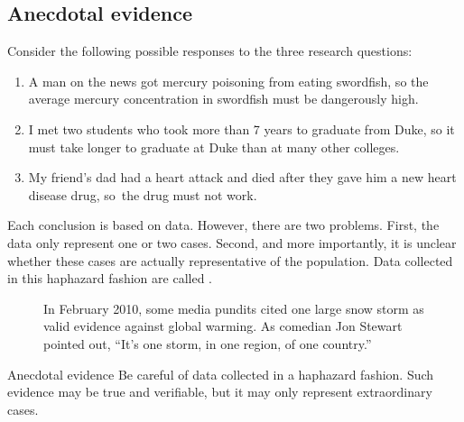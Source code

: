 \subsection{Anecdotal evidence}
\label{anecdotalEvidenceSubsection}


\noindent%
Consider the following possible responses to the three research questions:
\begin{enumerate}
\setlength{\itemsep}{0mm}
\item
    A man on the news got mercury poisoning from eating swordfish,
    so the average mercury concentration in swordfish must be
    dangerously high.
\item\label{iKnowThreeStudentsWhoTookMoreThan7YearsToGraduateAtDuke}
    I met two students who took more than 7 years to graduate
    from Duke, so it must take longer to graduate at Duke than
    at many other colleges.
\item\label{myFriendsDadDiedAfterSulphinpyrazon}
    My friend's dad had a heart attack and died after they gave
    him a new heart disease drug, so~the drug must not work.
\end{enumerate}
Each conclusion is based on data.
However, there are two problems.
First, the data only represent one or two cases.
Second, and more importantly, it is unclear whether these cases
are actually representative of the population.
Data collected in this haphazard fashion are called
.

\setlength{\captionwidth}{\textwidth-75mm}
\begin{figure}
  \centering
  \hspace{8mm}\hspace{4mm}
  \begin{minipage}[b]{\textwidth-75mm}
    \caption[anecdotal evidence]{In February 2010,
        some media pundits cited one large snow storm
        as valid evidence against global warming.
        As comedian Jon Stewart pointed out,
        ``It's one storm, in one region, of one country.''
    \label{mnWinter}}
  \end{minipage}
\end{figure}
\setlength{\captionwidth}{\mycaptionwidth}

\begin{onebox}{Anecdotal evidence}
Be careful of data collected in a haphazard fashion.
Such evidence may be true and verifiable, but it may
only represent extraordinary cases.
\end{onebox}

